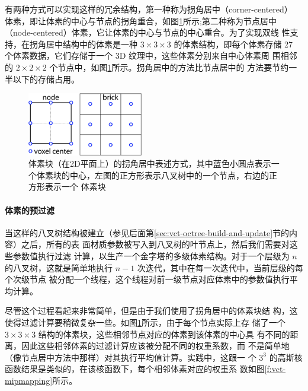 有两种方式可以实现这样的冗余结构，第一种称为拐角居中（corner-centered） 体素，即让体素的中心与节点的拐角重合，如图\ref{f:vct-13-11}所示;第二种称为节点居中（node-centered）体素，它让体素的中心与节点的中心重合。为了实现双线 性支持，在拐角居中结构中的体素是一种 $3\times  3\times  3$ 的体素结构，即每个体素存储 27 个体素数据，它们存储于一个 3D 纹理中，这些体素分别来自中心体素周 围相邻的 $2\times 2\times 2$ 个节点中，如图\ref{f:vct-13-11}所示。拐角居中的方法比节点居中的 方法要节约一半以下的存储占用。

\begin{figure}
	\sidecaption
	\includegraphics[width=0.45\textwidth]{figures/vct/vct-13-11}
	\caption{体素块（在2D平面上）的拐角居中表述方式，其中蓝色小圆点表示一 个体素块的中心，左图的正方形表示八叉树中的一个节点，右边的正方形表示一个 体素块}
	\label{f:vct-13-11}
\end{figure}



\paragraph{体素的预过滤}
当这样的八叉树结构被建立（参见后面第\ref{sec:vct-octree-build-and-update}节的内容）之后，所有的表 面材质参数被写入到八叉树的叶节点上，然后我们需要对这些参数值执行过滤 计算，以生产一个金字塔的多级体素结构。对于一个层级为 $n$ 的八叉树，这就是简单地执行 $n − 1$ 次迭代，其中在每一次迭代中，当前层级的每个次级节点 被分配一个线程，这个线程对前一级节点对应体素中的参数值执行平均计算。

尽管这个过程看起来非常简单，但是由于我们使用了拐角居中的体素块结 构，这使得过滤计算要稍微复杂一些。如图\ref{f:vct-13-11}所示，由于每个节点实际上存 储了一个 $3\times  3\times  3$ 结构的体素块，这些相邻节点对应的体素到该体素的中心具 有不同的距离，因此这些相邻体素的过滤计算应该被分配不同的权重系数，而 不是简单地（像节点居中方法中那样）对其执行平均值计算。实践中，这跟一 个 $3^{3}$ 的高斯核函数结果是类似的，在该核函数下，每个相邻体素对应的权重系 数如图\ref{f:vct-mipmapping}所示。

